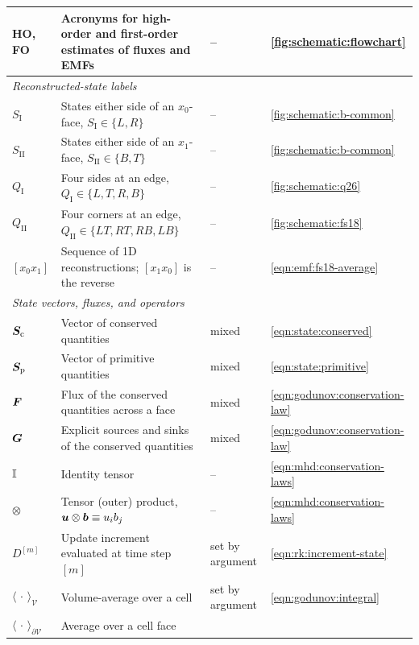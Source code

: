 \begin{table}
\begin{tabular}{l p{} l l}
HO, FO
    & Acronyms for high-order and first-order estimates of fluxes and EMFs
    & --
    & \cref{fig:schematic:flowchart} \\
\hline
\multicolumn{4}{l}{\textit{Reconstructed-state labels}} \\
\hline
$S_\mathrm{I}$
    & States either side of an $x_0$-face, $S_\mathrm{I} \in \{L, R\}$
    & --
    & \cref{fig:schematic:b-common} \\
$S_\mathrm{II}$
    & States either side of an $x_1$-face, $S_\mathrm{II} \in \{B, T\}$
    & --
    & \cref{fig:schematic:b-common} \\
$Q_\mathrm{I}$
    & Four sides at an edge, $Q_\mathrm{I} \in \{L, T, R, B\}$
    & --
    & \cref{fig:schematic:q26} \\
$Q_\mathrm{II}$
    & Four corners at an edge, $Q_\mathrm{II} \in \{LT, RT, RB, LB\}$
    & --
    & \cref{fig:schematic:fs18} \\
$[x_0 x_1]$
    & Sequence of 1D reconstructions; $[x_1 x_0]$ is the reverse
    & --
    & \cref{eqn:emf:fs18-average} \\
\hline
\multicolumn{4}{l}{\textit{State vectors, fluxes, and operators}} \\
\hline
$\bm{S}_\mathrm{c}$
    & Vector of conserved quantities
    & mixed
    & \cref{eqn:state:conserved} \\
$\bm{S}_\mathrm{p}$
    & Vector of primitive quantities
    & mixed
    & \cref{eqn:state:primitive} \\
$\bm{F}$
    & Flux of the conserved quantities across a face
    & mixed
    & \cref{eqn:godunov:conservation-law} \\
$\bm{G}$
    & Explicit sources and sinks of the conserved quantities
    & mixed
    & \cref{eqn:godunov:conservation-law} \\
$\mathbb{I}$
    & Identity tensor
    & --
    & \cref{eqn:mhd:conservation-laws} \\
$\otimes$
    & Tensor (outer) product, $\bm{u}\otimes\bm{b} \equiv u_i b_j$
    & --
    & \cref{eqn:mhd:conservation-laws} \\
$D^{[m]}$
    & Update increment evaluated at time step $[m]$
    & set by argument
    & \cref{eqn:rk:increment-state} \\
$\langle\,\cdot\,\rangle_\mathcal{V}$
    & Volume-average over a cell
    & set by argument
    & \cref{eqn:godunov:integral} \\
$\langle\,\cdot\,\rangle_{\partial\mathcal{V}}$
    & Average over a cell face

\end{tabular}
\end{table}
